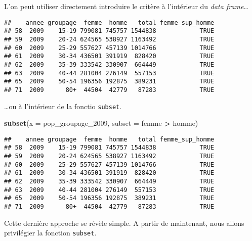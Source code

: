 \documentclass[]{book}
\newenvironment{Shaded}{\begin{snugshade}}{\end{snugshade}}
\newcommand{\KeywordTok}[1]{\textcolor[rgb]{0.13,0.29,0.53}{\textbf{#1}}}
\newcommand{\DataTypeTok}[1]{\textcolor[rgb]{0.13,0.29,0.53}{#1}}
\newcommand{\DecValTok}[1]{\textcolor[rgb]{0.00,0.00,0.81}{#1}}
\newcommand{\StringTok}[1]{\textcolor[rgb]{0.31,0.60,0.02}{#1}}
\newcommand{\OperatorTok}[1]{\textcolor[rgb]{0.81,0.36,0.00}{\textbf{#1}}}
\newcommand{\NormalTok}[1]{#1}
\begin{document}
L'on peut utiliser directement introduire le critère à l'intérieur du
\emph{data frame}\ldots{}

\begin{Shaded}
\end{Shaded}

\begin{verbatim}
##    annee groupage  femme  homme   total femme_sup_homme
## 58  2009    15-19 799081 745757 1544838            TRUE
## 59  2009    20-24 624565 538927 1163492            TRUE
## 60  2009    25-29 557627 457139 1014766            TRUE
## 61  2009    30-34 436501 391919  828420            TRUE
## 62  2009    35-39 333542 330907  664449            TRUE
## 63  2009    40-44 281004 276149  557153            TRUE
## 65  2009    50-54 196356 192875  389231            TRUE
## 71  2009      80+  44504  42779   87283            TRUE
\end{verbatim}

\ldots{}ou à l'intérieur de la fonctio \texttt{subset}.

\begin{Shaded}
\begin{Highlighting}[]
\KeywordTok{subset}\NormalTok{(}\DataTypeTok{x =}\NormalTok{ pop_groupage_}\DecValTok{2009}\NormalTok{, }\DataTypeTok{subset =}\NormalTok{ femme }\OperatorTok{>}\StringTok{ }\NormalTok{homme)}
\end{Highlighting}
\end{Shaded}

\begin{verbatim}
##    annee groupage  femme  homme   total femme_sup_homme
## 58  2009    15-19 799081 745757 1544838            TRUE
## 59  2009    20-24 624565 538927 1163492            TRUE
## 60  2009    25-29 557627 457139 1014766            TRUE
## 61  2009    30-34 436501 391919  828420            TRUE
## 62  2009    35-39 333542 330907  664449            TRUE
## 63  2009    40-44 281004 276149  557153            TRUE
## 65  2009    50-54 196356 192875  389231            TRUE
## 71  2009      80+  44504  42779   87283            TRUE
\end{verbatim}

Cette dernière approche se révèle simple. A partir de maintenant, nous
allons privilégier la fonction \texttt{subset}.
\end{document}
